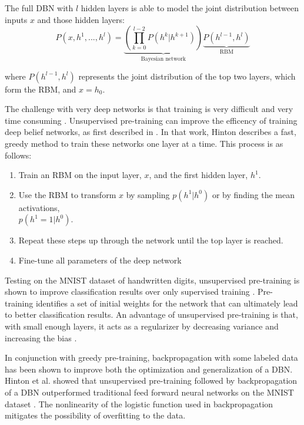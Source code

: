 \documentclass[12pt]{report}
\begin{document}
The full DBN with $l$ hidden layers is able to model the joint distribution between inputs $x$ and those hidden layers:
\begin{equation}
P(x, h^1, ..., h^l) = \underbrace{\left(\prod_{k=0}^{l-2}P(h^k|h^{k+1}) \right)}_{\text{Bayesian network}} \underbrace{P(h^{l-1},h^l)}_{\text{RBM}}
\end{equation}

where $P(h^{l-1},h^l)$ represents the joint distribution of the top two layers, which form the RBM, and $x = h_0$.

The challenge with very deep networks is that training is very difficult and very time consuming \cite{bengio_learning_2009}.
Unsupervised pre-training can improve the efficency of training deep belief networks, as first described in \cite{hinton_recognize_2007}.
In that work, Hinton describes a fast, greedy method to train these networks one layer at a time.  This process is as follows:
\begin{enumerate}
\item Train an RBM on the input layer, $x$, and the first hidden layer, $h^1$.
\item Use the RBM to transform $x$ by sampling $p(h^1|h^0)$ or by finding the mean activations,\\ $p(h^1=1|h^0)$.
\item Repeat these steps up through the network until the top layer is reached.
\item Fine-tune all parameters of the deep network
\end{enumerate}

 
Testing on the MNIST dataset of handwritten digits, unsupervised pre-training is shown to improve classification results over only supervised training  \cite{erhan_why_2010}. 
Pre-training identifies a set of initial weights for the network that can ultimately lead to better classification results.  
An advantage of unsupervised pre-training is that, with small enough layers, it acts as a regularizer by decreasing variance and increasing the bias \cite{hinton_recognize_2007}.  

In conjunction with greedy pre-training, backpropagation  with some labeled data has been shown to improve both the optimization and generalization of a DBN. 
Hinton et al. showed that unsupervised pre-training followed by backpropagation of a DBN outperformed traditional feed forward neural networks on the MNIST dataset \cite{hinton_fast_2006}.
The nonlinearity of the logistic function used in backpropagation mitigates the possibility of overfitting to the data.
\end{document}
